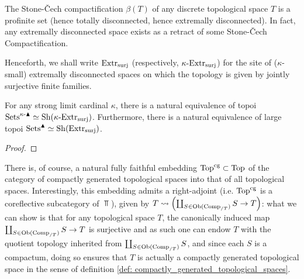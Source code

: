             \begin{example} \label{example: stone_cech_compactifications_of_discrete_spaces}
                The Stone-\v{C}ech compactification $\beta(T)$ of any discrete topological space $T$ is a profinite set (hence totally disconnected, hence extremally disconnected). In fact, any extremally disconnected space exists as a retract of some Stone-\v{C}ech Compactification.
            \end{example}
            \begin{convention} \label{conv: the_site_of_extremally_disconnected_spaces}
                Henceforth, we shall write $\mathrm{Extr}_{\mathrm{surj}}$ (respectively, $\kappa\text{-}\mathrm{Extr}_{\mathrm{surj}}$) for the site of ($\kappa$-small) extremally disconnected spaces on which the topology is given by jointly surjective finite families.
            \end{convention}
            \begin{proposition} \label{prop: condensed_sets_are_sheaves_on_extremally_disconnected_spaces}
                For any strong limit cardinal $\kappa$, there is a natural equivalence of topoi $\mathrm{Sets}^{\kappa\text{-}\blacktriangle} \simeq \mathrm{Sh}(\kappa\text{-}\mathrm{Extr}_{\mathrm{surj}})$. Furthermore, there is a natural equivalence of large topoi $\mathrm{Sets}^{\blacktriangle} \simeq \mathrm{Sh}(\mathrm{Extr}_{\mathrm{surj}})$.
            \end{proposition}
                \begin{proof}
                    
                \end{proof}
            \begin{remark}
                There is, of course, a natural fully faithful embedding $\mathrm{Top}^{\mathrm{cg}} \subset \mathrm{Top}$ of the category of compactly generated topological spaces into that of all topological spaces. Interestingly, this embedding admits a right-adjoint (i.e. $\mathrm{Top}^{\mathrm{cg}}$ is a coreflective subcategory of $\Top$), given by $T \leadsto \left(\coprod_{S \in \mathrm{Ob}(\mathrm{Comp}_{/T})} S \to T\right)$: what we can show is that for any topological space $T$, the canonically induced map $\coprod_{S \in \mathrm{Ob}(\mathrm{Comp}_{/T})} S \to T$ is surjective and as such one can endow $T$ with the quotient topology inherited from $\coprod_{S \in \mathrm{Ob}(\mathrm{Comp}_{/T})} S$, and since each $S$ is a compactum, doing so ensures that $T$ is actually a compactly generated topological space in the sense of definition \ref{def: compactly_generated_topological_spaces}. 
            \end{remark}
